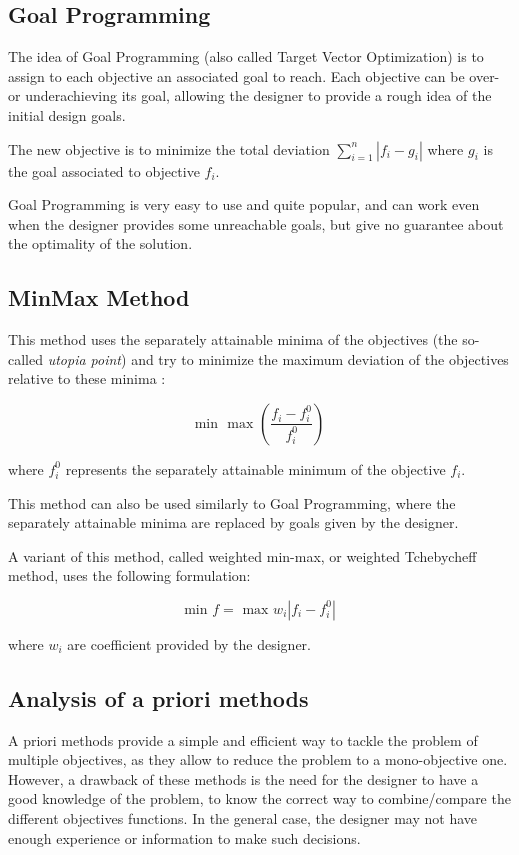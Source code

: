 \subsection{Goal Programming}

The idea of Goal Programming (also called Target Vector Optimization) \cite{charnes1957management} is to assign to each objective an associated goal to reach. Each objective can be over- or underachieving its goal, allowing the designer to provide a rough idea of the initial design goals.

The new objective is to minimize the total deviation $\displaystyle\sum_{i=1}^n |f_i - g_i|$ where $g_i$ is the goal associated to objective $f_i$.

Goal Programming is very easy to use and quite popular, and can work even when the designer provides some unreachable goals, but give no guarantee about the optimality of the solution.

\subsection{MinMax Method}

This method uses the separately attainable minima of the objectives (the so-called \emph{utopia point}) and try to minimize the maximum deviation of the objectives relative to these minima \cite{osyczka1984multicriterion}:

\[ \text{min } \text{ max } \left( \frac{f_i - f_i^0}{f_i^0} \right) \]

where $f_i^0$ represents the separately attainable minimum of the objective $f_i$.

This method can also be used similarly to Goal Programming, where the separately attainable minima are replaced by goals given by the designer.

A variant of this method, called weighted min-max, or weighted Tchebycheff method, uses the following formulation:

$$\text{min } f = \text{ max } w_i |f_i - f_i^0|$$

where $w_i$ are coefficient provided by the designer.

\subsection{Analysis of a priori methods}

A priori methods provide a simple and efficient way to tackle the problem of multiple objectives, as they allow to reduce the problem to a mono-objective one.
However, a drawback of these methods is the need for the designer to have a good knowledge of the problem, to know the correct way to combine/compare the different objectives functions. In the general case, the designer may not have enough experience or information to make such decisions.

